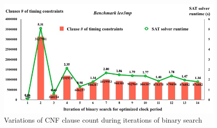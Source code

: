 \begin{figure}
    \centering
    \includegraphics[width=0.8\columnwidth]{leo3mp_Cl.png} %
    \caption{Variations of CNF clause count during iterations of binary search}
    \label{fig:Cl}
\end{figure}
